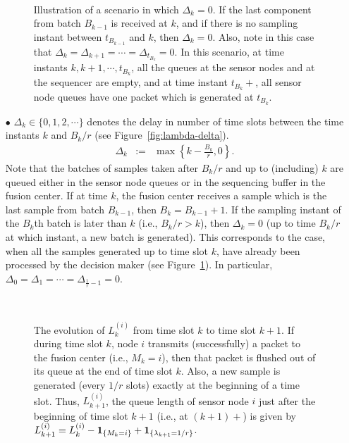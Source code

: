 \documentclass[acmtosn]{acmtrans2m}
\begin{document}
\begin{itemize}
 \begin{figure}[t]
   \centering \
   \caption{Illustration of a scenario in which $\Delta_k = 0$. If the 
    last component from batch $B_{k-1}$ is received at $k$, and if there 
    is no sampling instant between $t_{B_{k-1}}$ and $k$, then $\Delta_k = 0$.
    Also, note in this case that $\Delta_{k} = \Delta_{k+1} = \cdots = \Delta_{t_{B_k}} = 0$.
    In this scenario, at time instants $k,k+1,\cdots,t_{B_k}$, all the queues 
    at the sensor nodes and at the sequencer are empty, and at time instant
    $t_{B_k}+$, all sensor node queues have one packet which is generated at $t_{B_k}$.  
   }
 \label{fig:delta-future-b}
 \end{figure}
\item[$\bullet$] $\Delta_k \in \{0,1,2,\cdots\}$ denotes the delay 
      in number of time slots between the time instants $k$ and 
      $B_k/r$ (see Figure~\ref{fig:lambda-delta}). 
      \begin{eqnarray}
      \label{eqn:delta-defn}
      \Delta_k & := & \max\left\{k-\frac{B_k}{r}, 0\right\}.
      \end{eqnarray}
      Note that the batches of samples taken after $B_k/r$ and up to 
      (including) $k$ are queued either in the sensor node queues or 
      in the sequencing buffer in the fusion center. If at time $k$, 
      the fusion center receives a sample which 
      is the last sample from batch $B_{k-1}$, then $B_{k} = B_{k-1}+1$.
      If the sampling instant of the $B_k$th batch is later than $k$ 
      (i.e., $B_k/r > k$), then $\Delta_k = 0$ (up to time 
      $B_k/r$ at which instant, a new batch is generated). This corresponds 
      to the case, when all the samples generated up to time slot $k$, 
      have already been processed by the decision maker 
      (see Figure~\ref{fig:delta-future-b}). In particular, 
      $\Delta_0 = \Delta_1 = \cdots = \Delta_{\frac{1}{r}-1} = 0$.

\begin{figure}[t]
   \centering \
   \caption{The evolution of $L_k^{(i)}$ from time slot $k$ to time slot $k+1$. 
      If during time slot $k$, node $i$ transmits (successfully) a packet to the 
      fusion center (i.e., $M_k = i$), then that packet is flushed out of its 
      queue at the end of time slot $k$. Also, a new sample is generated 
      (every $1/r$ slots) exactly at the beginning of a time slot. Thus,
      $L^{(i)}_{k+1}$, the queue length of sensor node $i$ just after the 
      beginning of time slot $k+1$ (i.e., at $(k+1)+$) is given by 
      $L_{k+1}^{(i)} = L_k^{(i)} - {\bf 1}_{\{M_k=i\}} + {\bf 1}_{\{\lambda_{k+1} = 1/r\}}$.} 
   \label{fig:na_processing_embedding_sensor_side}
\end{figure}


\end{itemize}
\end{document}
